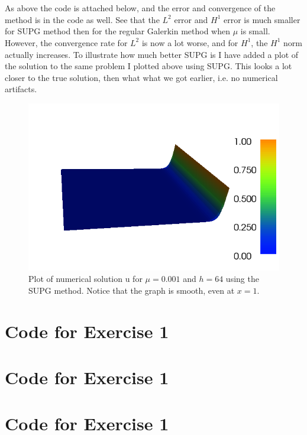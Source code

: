 \documentclass[11pt,a4paper]{report}
\begin{document}
\\
\\
As above the code is attached below, and the error and convergence of the method is in the code as well. See that the $L^2$ error and $H^1$ error is much smaller for SUPG method then for the regular Galerkin method when $\mu$ is small. However, the convergence rate for $L^2$ is now a lot worse, and for $H^1$, the $H^1$ norm actually increases. To illustrate how much better SUPG is I have added a plot of the solution to the same problem I plotted above using SUPG. This looks a lot closer to the true solution, then what what we got earlier, i.e. no numerical artifacts. 
\begin{figure}
  \includegraphics[width=\linewidth]{dolfin_plot_3.png}
  \caption{Plot of numerical solution u for $\mu=0.001$ and $h=64$ using the SUPG method. Notice that the graph is smooth, even at $x=1$. }
  \label{Fig 4}
\end{figure}
  
\section*{Code for Exercise 1}

\section*{Code for Exercise 1}

\section*{Code for Exercise 1}

\end{document}
